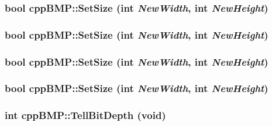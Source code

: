 \hypertarget{classcpp_b_m_p_9a6372827cbeb056c76f418bf764455d}{
\subsubsection[{SetSize}]{\setlength{\rightskip}{0pt plus 5cm}bool cppBMP::SetSize (int {\em NewWidth}, \/  int {\em NewHeight})}}
\label{classcpp_b_m_p_9a6372827cbeb056c76f418bf764455d}


\hypertarget{classcpp_b_m_p_9a6372827cbeb056c76f418bf764455d}{
\subsubsection[{SetSize}]{\setlength{\rightskip}{0pt plus 5cm}bool cppBMP::SetSize (int {\em NewWidth}, \/  int {\em NewHeight})}}
\label{classcpp_b_m_p_9a6372827cbeb056c76f418bf764455d}


\hypertarget{classcpp_b_m_p_9a6372827cbeb056c76f418bf764455d}{
\subsubsection[{SetSize}]{\setlength{\rightskip}{0pt plus 5cm}bool cppBMP::SetSize (int {\em NewWidth}, \/  int {\em NewHeight})}}
\label{classcpp_b_m_p_9a6372827cbeb056c76f418bf764455d}


\hypertarget{classcpp_b_m_p_9a6372827cbeb056c76f418bf764455d}{
\subsubsection[{SetSize}]{\setlength{\rightskip}{0pt plus 5cm}bool cppBMP::SetSize (int {\em NewWidth}, \/  int {\em NewHeight})}}
\label{classcpp_b_m_p_9a6372827cbeb056c76f418bf764455d}


\hypertarget{classcpp_b_m_p_95cf17f997cf74cbfaf889572bf7d751}{
\subsubsection[{TellBitDepth}]{\setlength{\rightskip}{0pt plus 5cm}int cppBMP::TellBitDepth (void)}}
\label{classcpp_b_m_p_95cf17f997cf74cbfaf889572bf7d751}


